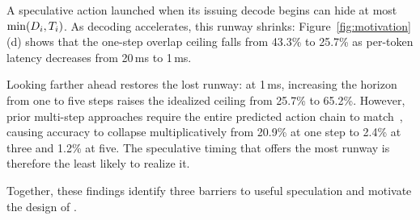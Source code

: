 A speculative action launched when its issuing decode begins can hide at most
$\min(D_i,T_i)$. As decoding accelerates, this runway shrinks:
Figure~\ref{fig:motivation}(d) shows that the one-step overlap ceiling falls
from 43.3\% to 25.7\% as per-token latency decreases from 20\,ms to 1\,ms.

Looking farther ahead restores the lost runway: at 1\,ms, increasing the
horizon from one to five steps raises the idealized ceiling from 25.7\% to
65.2\%. 
However, prior multi-step approaches require the entire predicted action chain to match~\citep{sui2026parallelizing,bpaste2026,ye2025speculative}, causing accuracy to
collapse multiplicatively from 20.9\% at one step to 2.4\% at three and 1.2\% at five. 
The speculative timing that offers the most runway is therefore the least likely to realize it.


Together, these findings identify three barriers to useful speculation and motivate the design of \sysname{}.